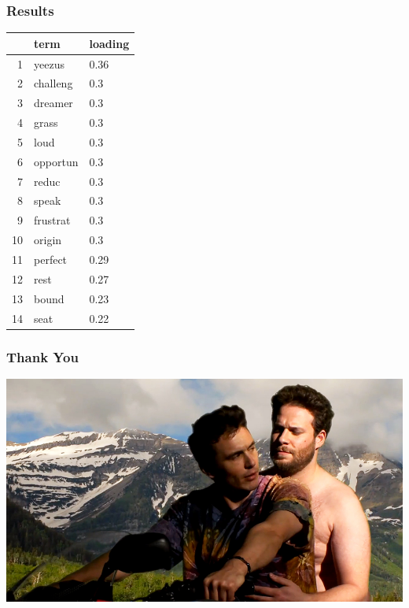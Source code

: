 \documentclass{beamer}
\begin{document}
\begin{frame}
\frametitle{Results}
\pause
\begin{table}[ht]
\centering
\begin{tabular}{rll}
  \hline
 & term & loading \\ 
  \hline
1 & yeezus & 0.36 \\ 
  2 & challeng & 0.3 \\ 
  3 & dreamer & 0.3 \\ 
  4 & grass & 0.3 \\ 
  5 & loud & 0.3 \\ 
  6 & opportun & 0.3 \\ 
  7 & reduc & 0.3 \\ 
  8 & speak & 0.3 \\ 
  9 & frustrat & 0.3 \\ 
  10 & origin & 0.3 \\ 
  11 & perfect & 0.29 \\ 
  12 & rest & 0.27 \\ 
  13 & bound & 0.23 \\ 
  14 & seat & 0.22 \\ 
   \hline
\end{tabular}
\end{table}
\end{frame}



\begin{frame}
\frametitle{Thank You}
\pause
\begin{center}
\includegraphics[height=1.0\textheight]{Images/rogen.jpg}
\end{center}
\end{frame}
\end{document}
